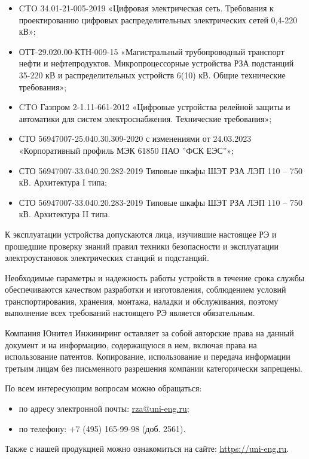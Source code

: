 \documentclass[a4paper, 12pt, table, hidelinks, DIV=calc]{extarticle}
\begin{document}
\begin{itemize}
\item CTO 34.01-21-005-2019 «Цифровая электрическая сеть. Требования к проектированию цифровых распределительных электрических сетей 0,4-220 кВ»;
\item \sloppy ОТТ-29.020.00-КТН-009-15 «Магистральный трубопроводный транспорт нефти и нефтепродуктов. Микропроцессорные устройства РЗА подстанций 35-220 кВ и распределительных устройств 6(10) кВ. Общие технические требования»;
\item CTO Газпром 2-1.11-661-2012 «Цифровые устройства релейной защиты и автоматики для систем электроснабжения. Технические требования»;
\item СТО 56947007-25.040.30.309-2020 с изменениями от 24.03.2023 «Корпоративный профиль МЭК 61850 ПАО ''ФСК ЕЭС''»;
\item СТО 56947007-33.040.20.282-2019 Типовые шкафы ШЭТ РЗА ЛЭП 110 – 750 кВ. Архитектура I типа;
\item СТО 56947007-33.040.20.283-2019 Типовые шкафы ШЭТ РЗА ЛЭП 110 – 750 кВ. Архитектура II типа.
\end{itemize}

\par
К эксплуатации устройства допускаются лица, изучившие настоящее РЭ и прошедшие проверку знаний правил техники безопасности и эксплуатации электроустановок электрических станций и подстанций.


\par
Необходимые параметры и надежность работы устройств в течение срока службы обеспечиваются качеством разработки и изготовления, соблюдением условий транспортирования, хранения, монтажа, наладки и обслуживания, поэтому выполнение всех требований настоящего РЭ является обязательным.


\par
Компания Юнител Инжиниринг оставляет за собой авторские права на данный документ и на информацию, содержащуюся в нем, включая права на использование патентов. Копирование, использование и передача информации третьим лицам без письменного разрешения компании категорически запрещены.

\par
По всем интересующим вопросам можно обращаться:
\begin{itemize}
\item по адресу электронной почты: \href{mailto:rza@uni-eng.ru}{\color{unigreen}\uline{rza@uni-eng.ru}};
\item по телефону: +7 (495) 165-99-98 (доб. 2561).
\end{itemize}
Также с нашей продукцией можно ознакомиться на сайте: \href{https://uni-eng.ru}{\color{unigreen}\uline{https://uni-eng.ru}}.\clearpage
\newpage
\end{document}
